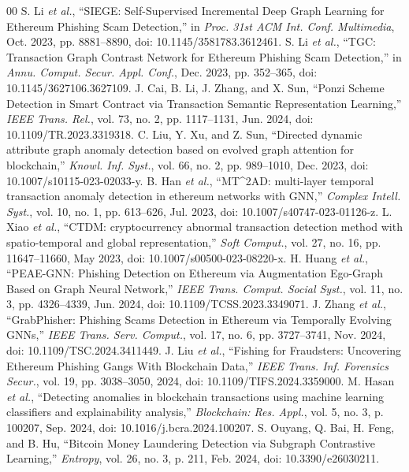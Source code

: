\documentclass{ieeeaccess}
\begin{document}
\begin{thebibliography}{00}
 S. Li \emph{et al.}, ``SIEGE: Self-Supervised Incremental Deep Graph Learning for Ethereum Phishing Scam Detection,'' in \emph{Proc. 31st ACM Int. Conf. Multimedia}, Oct. 2023, pp. 8881--8890, doi: 10.1145/3581783.3612461.
 S. Li \emph{et al.}, ``TGC: Transaction Graph Contrast Network for Ethereum Phishing Scam Detection,'' in \emph{Annu. Comput. Secur. Appl. Conf.}, Dec. 2023, pp. 352--365, doi: 10.1145/3627106.3627109.
 J. Cai, B. Li, J. Zhang, and X. Sun, ``Ponzi Scheme Detection in Smart Contract via Transaction Semantic Representation Learning,'' \emph{IEEE Trans. Rel.}, vol. 73, no. 2, pp. 1117--1131, Jun. 2024, doi: 10.1109/TR.2023.3319318.
 C. Liu, Y. Xu, and Z. Sun, ``Directed dynamic attribute graph anomaly detection based on evolved graph attention for blockchain,'' \emph{Knowl. Inf. Syst.}, vol. 66, no. 2, pp. 989--1010, Dec. 2023, doi: 10.1007/s10115-023-02033-y.
 B. Han \emph{et al.}, ``MT\textasciicircum{}2AD: multi-layer temporal transaction anomaly detection in ethereum networks with GNN,'' \emph{Complex Intell. Syst.}, vol. 10, no. 1, pp. 613--626, Jul. 2023, doi: 10.1007/s40747-023-01126-z.
 L. Xiao \emph{et al.}, ``CTDM: cryptocurrency abnormal transaction detection method with spatio-temporal and global representation,'' \emph{Soft Comput.}, vol. 27, no. 16, pp. 11647--11660, May 2023, doi: 10.1007/s00500-023-08220-x.
 H. Huang \emph{et al.}, ``PEAE-GNN: Phishing Detection on Ethereum via Augmentation Ego-Graph Based on Graph Neural Network,'' \emph{IEEE Trans. Comput. Social Syst.}, vol. 11, no. 3, pp. 4326--4339, Jun. 2024, doi: 10.1109/TCSS.2023.3349071.
 J. Zhang \emph{et al.}, ``GrabPhisher: Phishing Scams Detection in Ethereum via Temporally Evolving GNNs,'' \emph{IEEE Trans. Serv. Comput.}, vol. 17, no. 6, pp. 3727--3741, Nov. 2024, doi: 10.1109/TSC.2024.3411449.
 J. Liu \emph{et al.}, ``Fishing for Fraudsters: Uncovering Ethereum Phishing Gangs With Blockchain Data,'' \emph{IEEE Trans. Inf. Forensics Secur.}, vol. 19, pp. 3038--3050, 2024, doi: 10.1109/TIFS.2024.3359000.
 M. Hasan \emph{et al.}, ``Detecting anomalies in blockchain transactions using machine learning classifiers and explainability analysis,'' \emph{Blockchain: Res. Appl.}, vol. 5, no. 3, p. 100207, Sep. 2024, doi: 10.1016/j.bcra.2024.100207.
 S. Ouyang, Q. Bai, H. Feng, and B. Hu, ``Bitcoin Money Laundering Detection via Subgraph Contrastive Learning,'' \emph{Entropy}, vol. 26, no. 3, p. 211, Feb. 2024, doi: 10.3390/e26030211.

\end{thebibliography}
\end{document}
